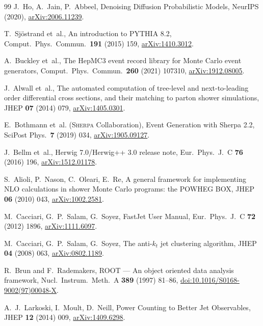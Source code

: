 \documentclass[11pt,a4paper]{article}          %
\begin{document}
\begin{thebibliography}{99}
  J.~Ho, A.~Jain, P.~Abbeel,
  Denoising Diffusion Probabilistic Models,
  NeurIPS (2020),
  \href{https://arxiv.org/abs/2006.11239}{arXiv:2006.11239}.

  T.~Sj\"ostrand et~al.,
  An introduction to PYTHIA 8.2,
  Comput.\ Phys.\ Commun.\ \textbf{191} (2015) 159,
  \href{https://arxiv.org/abs/1410.3012}{arXiv:1410.3012}.

  A.~Buckley et~al.,
  The HepMC3 event record library for Monte Carlo event generators,
  Comput.\ Phys.\ Commun.\ \textbf{260} (2021) 107310,
  \href{https://arxiv.org/abs/1912.08005}{arXiv:1912.08005}.

  J.~Alwall et~al.,
  The automated computation of tree-level and next-to-leading order
  differential cross sections, and their matching to parton shower simulations,
  JHEP \textbf{07} (2014) 079,
  \href{https://arxiv.org/abs/1405.0301}{arXiv:1405.0301}.

  E.~Bothmann et~al. (\textsc{Sherpa} Collaboration),
  Event Generation with Sherpa 2.2,
  SciPost Phys.\ \textbf{7} (2019) 034,
  \href{https://arxiv.org/abs/1905.09127}{arXiv:1905.09127}.

  J.~Bellm et~al.,
  Herwig 7.0/Herwig++ 3.0 release note,
  Eur.\ Phys.\ J.\ C \textbf{76} (2016) 196,
  \href{https://arxiv.org/abs/1512.01178}{arXiv:1512.01178}.

  S.~Alioli, P.~Nason, C.~Oleari, E.~Re,
  A general framework for implementing NLO calculations in shower Monte
  Carlo programs: the POWHEG BOX,
  JHEP \textbf{06} (2010) 043,
  \href{https://arxiv.org/abs/1002.2581}{arXiv:1002.2581}.

  M.~Cacciari, G.~P.~Salam, G.~Soyez,
  FastJet User Manual,
  Eur.\ Phys.\ J.\ C \textbf{72} (2012) 1896,
  \href{https://arxiv.org/abs/1111.6097}{arXiv:1111.6097}.

  M.~Cacciari, G.~P.~Salam, G.~Soyez,
  The anti-$k_t$ jet clustering algorithm,
  JHEP \textbf{04} (2008) 063,
  \href{https://arxiv.org/abs/0802.1189}{arXiv:0802.1189}.

  R.~Brun and F.~Rademakers,
  ROOT --- An object oriented data analysis framework,
  Nucl.\ Instrum.\ Meth.\ A \textbf{389} (1997) 81--86,
  \href{https://doi.org/10.1016/S0168-9002(97)00048-X}{doi:10.1016/S0168-9002(97)00048-X}.

  A.~J.~Larkoski, I.~Moult, D.~Neill,
  Power Counting to Better Jet Observables,
  JHEP \textbf{12} (2014) 009,
  \href{https://arxiv.org/abs/1409.6298}{arXiv:1409.6298}.


\end{thebibliography}
\end{document}
